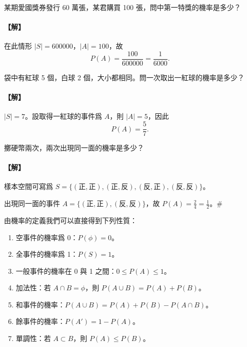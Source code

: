 \medskip
\begin{example}\label{ex:b5-3-2}
某期愛國獎券發行 60 萬張，某君購買 100 張，問中第一特獎的機率是多少？
\end{example}
\paragraph{【解】}
在此情形 $|S|=600000$，$|A|=100$，故
\[
P(A) = \frac{100}{600000} = \frac{1}{6000}.
\]

\medskip
\begin{example}\label{ex:b5-3-3}
袋中有紅球 5 個，白球 2 個，大小都相同。問一次取出一紅球的機率是多少？
\end{example}
\paragraph{【解】}
$|S|=7$。設取得一紅球的事件爲 $A$，則 $|A|=5$，因此
\[
P(A) = \frac{5}{7}. \tag*{\#}
\]

\medskip
\begin{example}\label{ex:b5-3-4}
擲硬幣兩次，兩次出現同一面的機率是多少？
\end{example}
\paragraph{【解】}
樣本空間可寫爲 $S=\{(\text{正}, \text{正}), (\text{正}, \text{反}), (\text{反}, \text{正}), (\text{反}, \text{反})\}$。

出現同一面的事件 $A=\{(\text{正}, \text{正}), (\text{反}, \text{反})\}$，故 $P(A) = \frac{2}{4} = \frac{1}{2}$。\hfill $\#$

\medskip
由機率的定義我們可以直接得到下列性質：
\begin{enumerate}[label=\Roman*., itemsep=2pt, topsep=2pt]
  \item 空事件的機率爲 0：$P(\phi) = 0$。
  \item 全事件的機率爲 1：$P(S)=1$。
  \item 一般事件的機率在 0 與 1 之間：$0 \le P(A) \le 1$。
  \item 加法性：若 $A \cap B = \phi$，則 $P(A \cup B) = P(A) + P(B)$。
  \item 和事件的機率：$P(A \cup B) = P(A) + P(B) - P(A \cap B)$。
  \item 餘事件的機率：$P(A') = 1 - P(A)$。
  \item 單調性：若 $A \subset B$，則 $P(A) \le P(B)$。
\end{enumerate}

